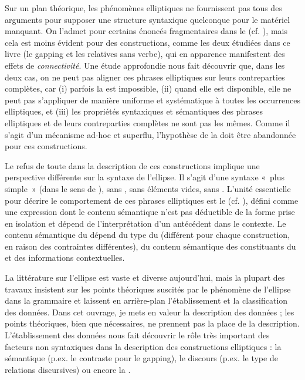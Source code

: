 Sur un plan théorique, les phénomènes elliptiques ne fournissent pas tous des arguments pour supposer une structure syntaxique quelconque pour le matériel manquant. On l’admet pour certains énoncés fragmentaires dans le  (cf. \citealt{GinzburgEtAl2000,GinzburgEtAl2004,Ginzburg2012}), mais cela est moins évident pour des constructions, comme les deux étudiées dans ce livre (le gapping et les relatives sans verbe), qui en apparence manifestent des effets de \textit{connectivité}. Une étude approfondie nous fait découvrir que, dans les deux cas, on ne peut pas aligner ces phrases elliptiques sur leurs contreparties complètes, car (i) parfois la  est impossible, (ii) quand elle est disponible, elle ne peut pas s’appliquer de manière uniforme et systématique à toutes les occurrences elliptiques, et (iii) les propriétés syntaxiques et sémantiques des phrases elliptiques et de leurs contreparties complètes ne sont pas les mêmes. Comme il s’agit d’un mécanisme ad-hoc et superflu, l’hypothèse de la  doit être abandonnée pour ces constructions. 


  
Le refus de toute  dans la description de ces constructions implique une perspective différente sur la syntaxe de l’ellipse. Il s’agit d’une syntaxe «~plus simple~» (dans le sens de \citealt{CulicoverEtAl2005}), sans , sans éléments vides, sans . L’unité essentielle pour décrire le comportement de ces phrases elliptiques est le \textit{} (cf. \citealt{GinzburgEtAl2000}), défini comme une expression dont le contenu sémantique n’est pas déductible de la forme prise en isolation et dépend de l’interprétation d’un antécédent dans le contexte. Le contenu sémantique du  dépend du type du  (différent pour chaque construction, en raison des contraintes différentes), du contenu sémantique des constituants du  et des informations contextuelles. 



La littérature sur l’ellipse est vaste et diverse aujourd’hui, mais la plupart des travaux insistent sur les points théoriques suscités par le phénomène de l’ellipse dans la grammaire et laissent en arrière-plan l’établissement et la classification des données. Dans cet ouvrage, je mets en valeur la description des données ; les points théoriques, bien que nécessaires, ne prennent pas la place de la description. L’établissement des données nous fait découvrir le rôle très important des facteurs non syntaxiques dans la description des constructions elliptiques : la sémantique (p.ex. le contraste pour le gapping), le discours (p.ex. le type de relations discursives) ou encore la .



